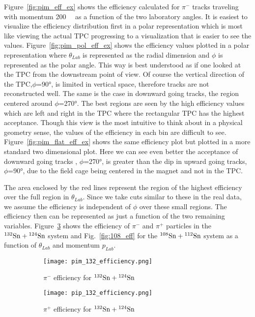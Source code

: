 Figure~\ref{fig:pim_eff_ex} shows the efficiency calculated for $\pi^-$ tracks traveling with momentum \SI{200}{\mega\eVperc} as a function of the two laboratory angles. It is easiest to visualize the efficiency distribution first in a polar representation which is most like viewing the actual TPC progressing to a visualization that is easier to see the values. Figure~\ref{fig:pim_pol_eff_ex} shows the efficiency values plotted in a polar representation where $\theta_{Lab}$ is represented as the radial dimension and $\phi$ is represented as the polar angle. This way is best understood as if one looked at the TPC from the downstream point of view. Of course the vertical direction of the TPC,$\phi$=\ang{90}, is limited in vertical space, therefore tracks are not reconstructed well. The same is the case in downward going tracks, the region centered around $\phi$=\ang{270}. The best regions are seen by the high efficiency values which are left and right in the TPC where the rectangular TPC has the highest acceptance. Though this view is the most intuitive to think about in a physical geometry sense, the values of the efficiency in each bin are difficult to see. Figure~\ref{fig:pim_flat_eff_ex} shows the same efficiency plot but plotted in a more standard two dimensional plot. Here we can see even better the acceptance of downward going tracks , $\phi$=\ang{270}, is greater than the dip in upward going tracks, $\phi$=\ang{90}, due to the field cage being centered in the magnet and not in the TPC. 

The area enclosed by the red lines represent the region of the highest efficiency over the full region in $\theta_{Lab}$.  Since we take cuts similar to these in the real data, we assume the efficiency is independent of $\phi$ over these small regions. The efficiency then can be represented as just a function of the two remaining variables. Figure~\ref{fig:132_eff} shows the efficiency of $\pi^-$ and $\pi^+$ particles in the ${}^{132}\mathrm{Sn} + {}^{124}\mathrm{Sn}$ system and Fig.~\ref{fig:108_eff} for the ${}^{108}\mathrm{Sn} + {}^{112}\mathrm{Sn}$ system as a function of $\theta_{Lab}$ and momentum $p_{Lab}$. 



\begin{figure}[!htb]
    \centering
    \begin{subfigure}[t]{0.49\textwidth}
        \centering
        \texttt{[image: pim\_132\_efficiency.png]}
        \caption{$\pi^-$ efficiency for ${}^{132}\mathrm{Sn} + {}^{124}\mathrm{Sn}$} \label{fig:pim_132_eff}
    \end{subfigure}
    \hfill
    \begin{subfigure}[t]{.49\textwidth}
        \centering
        \texttt{[image: pip\_132\_efficiency.png]} 
        \caption{$\pi^+$ efficiency for ${}^{132}\mathrm{Sn} + {}^{124}\mathrm{Sn}$} \label{fig:pip_132_eff}
    \end{subfigure}
  
    \caption{ }
\label{fig:132_eff}
\end{figure}



